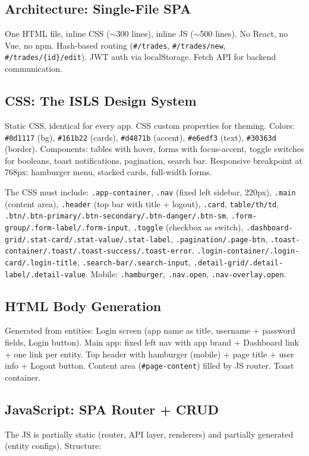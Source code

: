 \documentclass[11pt,a4paper]{article}
\begin{document}
\subsection{Architecture: Single-File SPA}
One HTML file, inline CSS ($\sim$300 lines), inline JS ($\sim$500 lines). No React, no Vue, no npm. Hash-based routing (\texttt{\#/trades}, \texttt{\#/trades/new}, \texttt{\#/trades/\{id\}/edit}). JWT auth via localStorage. Fetch API for backend communication.

\subsection{CSS: The ISLS Design System}
Static CSS, identical for every app. CSS custom properties for theming. Colors: \texttt{\#0d1117} (bg), \texttt{\#161b22} (cards), \texttt{\#d4871b} (accent), \texttt{\#e6edf3} (text), \texttt{\#30363d} (border). Components: tables with hover, forms with focus-accent, toggle switches for booleans, toast notifications, pagination, search bar. Responsive breakpoint at 768px: hamburger menu, stacked cards, full-width forms.

The CSS must include: \texttt{.app-container}, \texttt{.nav} (fixed left sidebar, 220px), \texttt{.main} (content area), \texttt{.header} (top bar with title + logout), \texttt{.card}, \texttt{table/th/td}, \texttt{.btn/.btn-primary/.btn-secondary/.btn-danger/.btn-sm}, \texttt{.form-group/.form-label/.form-input}, \texttt{.toggle} (checkbox as switch), \texttt{.dashboard-grid/.stat-card/.stat-value/.stat-label}, \texttt{.pagination/.page-btn}, \texttt{.toast-container/.toast/.toast-success/.toast-error}, \texttt{.login-container/.login-card/.login-title}, \texttt{.search-bar/.search-input}, \texttt{.detail-grid/.detail-label/.detail-value}. Mobile: \texttt{.hamburger}, \texttt{.nav.open}, \texttt{.nav-overlay.open}.

\subsection{HTML Body Generation}
Generated from entities: Login screen (app name as title, username + password fields, Login button). Main app: fixed left nav with app brand + Dashboard link + one link per entity. Top header with hamburger (mobile) + page title + user info + Logout button. Content area (\texttt{\#page-content}) filled by JS router. Toast container.

\subsection{JavaScript: SPA Router + CRUD}
The JS is partially static (router, API layer, renderers) and partially generated (entity configs). Structure:
\end{document}
